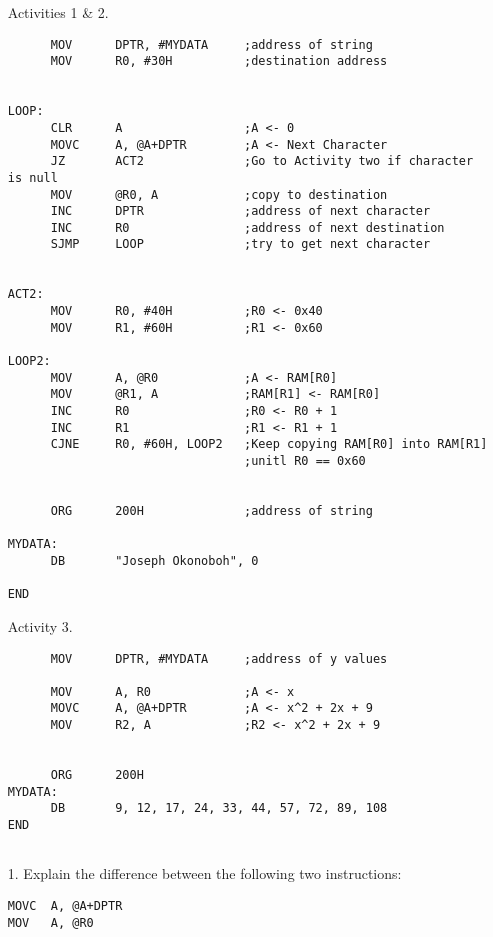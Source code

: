 \documentclass[9pt]{article}
\begin{document}
\begin{enumerate}
   \item[Activities 1 \& 2.] \begin{verbatim}
      MOV      DPTR, #MYDATA     ;address of string
      MOV      R0, #30H          ;destination address


LOOP:
      CLR      A                 ;A <- 0
      MOVC     A, @A+DPTR        ;A <- Next Character
      JZ       ACT2              ;Go to Activity two if character is null
      MOV      @R0, A            ;copy to destination
      INC      DPTR              ;address of next character
      INC      R0                ;address of next destination
      SJMP     LOOP              ;try to get next character


ACT2:								
      MOV      R0, #40H          ;R0 <- 0x40
      MOV      R1, #60H          ;R1 <- 0x60
	
LOOP2:
      MOV      A, @R0            ;A <- RAM[R0]
      MOV      @R1, A            ;RAM[R1] <- RAM[R0]
      INC      R0                ;R0 <- R0 + 1
      INC      R1                ;R1 <- R1 + 1
      CJNE     R0, #60H, LOOP2   ;Keep copying RAM[R0] into RAM[R1]
                                 ;unitl R0 == 0x60


      ORG      200H              ;address of string

MYDATA:
      DB       "Joseph Okonoboh", 0

END
         \end{verbatim}
   \item[Activity 3.] \begin{verbatim}
      MOV      DPTR, #MYDATA     ;address of y values

      MOV      A, R0             ;A <- x
      MOVC     A, @A+DPTR        ;A <- x^2 + 2x + 9
      MOV      R2, A             ;R2 <- x^2 + 2x + 9


      ORG      200H
MYDATA:
      DB       9, 12, 17, 24, 33, 44, 57, 72, 89, 108
END
		
         \end{verbatim}
   \item[1.] Explain the difference between the following two instructions:
   \begin{verbatim}
MOVC  A, @A+DPTR
MOV   A, @R0
         \end{verbatim}
         

\end{enumerate}
\end{document}
